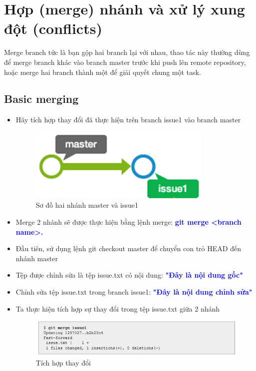 \documentclass[12pt,a4paper]{report}
\begin{document}
\section{Hợp (merge) nhánh và xử lý xung đột (conflicts)}

Merge branch tức là bạn gộp hai branch lại với nhau, thao tác này thường dùng để merge branch khác vào branch master trước khi push lên remote repository, hoặc merge hai branch thành một để giải quyết chung một task.	
\subsection{Basic merging}
\begin{itemize}
 \item Hãy tích hợp thay đổi đã thực hiện trên branch issue1 vào branch master

\begin{figure}[!ht]
	\centering
	\includegraphics[width=0.4\linewidth]{screenshot060}
\caption{Sơ đồ hai nhánh master và issue1}
	\label{fig:screenshot060}	
\end{figure}

\item Merge 2 nhánh sẽ được thực hiện bằng lệnh merge: \textcolor{blue}{\bf git merge <branch name>.}
\item Đầu tiên, sử dụng lệnh git checkout master để chuyển con trỏ HEAD đến nhánh master	
\item Tệp được chỉnh sửa là tệp issue.txt có nội dung: \textcolor{blue}{\bf "Đây là nội dung gốc"}	
\item Chỉnh sửa tệp issue.txt trong branch issue1: \textcolor{blue}{\bf "Đây là nội dung chỉnh sửa"}
\item Ta thực hiện tích hợp sự thay đổi trong tệp issue.txt giữa 2 nhánh

\begin{figure}[!ht]
	\centering	
	\includegraphics[width=0.8\linewidth]{screenshot01}
\caption{Tích hợp thay đổi}
	\label{fig:screenshot01}
\end{figure}


\end{itemize}
\end{document}
